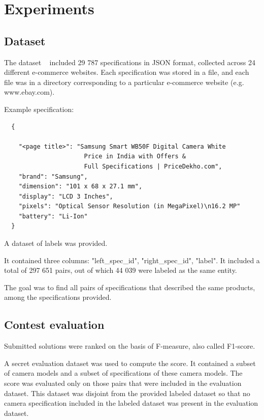 \documentclass[sigconf]{acmart}
\begin{document}
\section{Experiments}

\subsection{Dataset}
\label{dataset}

The dataset ~\cite{sigmod_task} included 29 787 specifications in JSON format, collected across 24 different e-commerce websites. Each specification was stored in a file, and each file was in a directory corresponding to a particular e-commerce website (e.g. www.ebay.com).

Example specification:
{
  \scriptsize
  \begin{verbatim}
  {

    "<page title>": "Samsung Smart WB50F Digital Camera White
                      Price in India with Offers & 
                      Full Specifications | PriceDekho.com",
    "brand": "Samsung",
    "dimension": "101 x 68 x 27.1 mm",
    "display": "LCD 3 Inches",
    "pixels": "Optical Sensor Resolution (in MegaPixel)\n16.2 MP"
    "battery": "Li-Ion"
  }
  \end{verbatim}
}

A dataset of labels was provided. 

It contained three columns: "left\_spec\_id", "right\_spec\_id", "label". It included a total of 297 651 pairs, out of which 44 039 were labeled as the same entity.

The goal was to find all pairs of specifications that described the same products, among the specifications provided.

\subsection{Contest evaluation}
\label{evaluation}
Submitted solutions were ranked on the basis of F-measure, also called F1-score. 

A secret evaluation dataset was used to compute the score. It contained a subset of camera models and a subset of specifications of these camera models. The score was evaluated only on those pairs that were included in the evaluation dataset. This dataset was disjoint from the provided labeled dataset so that no camera specification included in the labeled dataset was present in the evaluation dataset.
\end{document}
